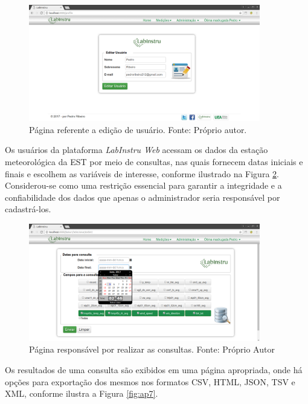 \begin{figure}[h!]
	\centering
	\includegraphics[width=0.9\textwidth]{./img/ap6.png}
	\caption{Página referente a edição de usuário. Fonte: Próprio autor.} \label{fig:ap6}
\end{figure}


Os usuários da plataforma \emph{LabInstru Web} acessam os dados da estação meteorológica da EST por meio de consultas, nas quais fornecem datas iniciais e finais e escolhem as variáveis de interesse, conforme ilustrado na Figura \ref{fig:ap3}. Considerou-se como uma restrição essencial para garantir a integridade e a confiabilidade dos dados que apenas o administrador seria responsável por cadastrá-los.


\begin{figure}[h!]
	\centering
	\includegraphics[width=0.9\textwidth]{./img/ap3.png}
	\caption{Página responsável por realizar as consultas. Fonte: Próprio Autor} \label{fig:ap3}
\end{figure}

Os resultados de uma consulta são exibidos em uma página apropriada, onde há opções para exportação dos mesmos nos formatos CSV, HTML, JSON, TSV e XML, conforme ilustra a Figura \ref{fig:ap7}.

